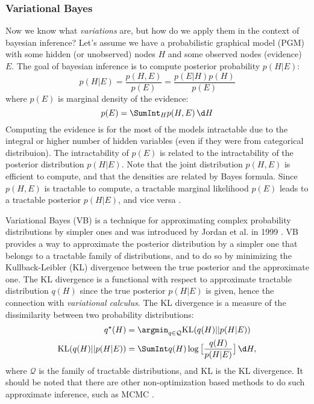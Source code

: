 \subsubsection*{Variational Bayes}
Now we know what \textit{variations} are, but how do we apply them in the context of bayesian inference? Let's assume we have a probabilistic
graphical model (PGM)\cite{graphical-models-2023} with some hidden (or unobserved) nodes $H$ and some observed nodes (evidence) $E$. The goal 
of bayesian inference is to compute posterior probability $p(H|E)$:
$$
p(H|E) = \frac{p(H,E)}{p(E)} = \frac{p(E|H) p(H)}{p(E)}
$$ 
where $p(E)$ is marginal density of the evidence:
$$
p(E) = \SumInt_{H} p(H,E)\, \d H
$$
Computing the evidence is for the most of the models intractable due to the integral or higher number of hidden variables (even if they were from
categorical distribuion). The intractability of $p(E)$ is related to the intractability of the
posterior distribution $p(H|E)$. Note that the joint distribution $p(H, E)$ is efficient to compute, and that the densities are related by Bayes formula.
Since $p(H, E)$ is tractable to compute, a tractable marginal likelihood $p(E)$ leads to a tractable posterior $p(H|E)$, and vice versa \cite{intro-vae-2019,vb-intro-1999}.
 
Variational Bayes (VB) is a technique for approximating complex probability distributions by simpler ones and was introduced by Jordan et al. in 1999 \cite{vb-intro-1999}. 
VB provides a way to approximate the posterior distribution by a simpler one that belongs to a tractable family of distributions, and to do so
by minimizing the Kullback-Leibler (KL) divergence between the true posterior and the approximate one. The KL divergence is a functional with respect 
to approximate tractable distribution $q(H)$ since the true posterior $p(H|E)$ is given, hence the connection with \textit{variational calculus}.  
The KL divergence is a measure of the dissimilarity between two probability distributions:
\begin{align*}
q^\star(H) &= \argmin_{q \in \mathcal{Q}} \mathrm{KL}(q(H) || p(H | E)) \\
\mathrm{KL}(q(H) || p(H | E)) &= \SumInt q(H) \log \big[ \frac{q(H)}{p(H|E)} \big]\,\d H,
\end{align*}
where $\mathcal{Q}$ is the family of tractable distributions, and $\mathrm{KL}$ is the KL divergence. It should be noted that there are other 
non-optimization based methods to do such approximate inference, such as MCMC \cite{wiki-mcmc-2023}. 

